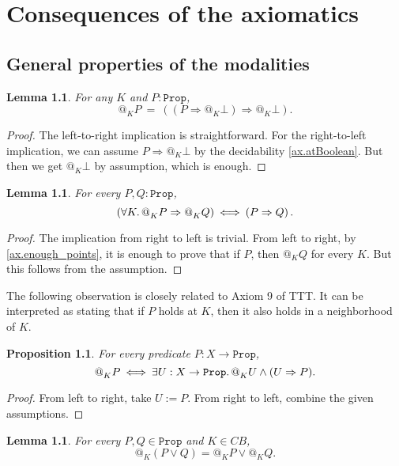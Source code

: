 \documentclass[11pt, oneside, article]{memoir}
\makeatletter
\theoremstyle{plain}
\newtheorem{proposition}[theorem]{Proposition}
\newtheorem{lemma}[theorem]{Lemma}
\theoremstyle{definition}
\theoremstyle{remark}
\newcommand{\const}[1]{\mathtt{#1}}
\newcommand{\Prop}{\const{Prop}}
\newcommand{\BaseSpace}{B}
\newcommand{\CB}{C\BaseSpace}
\newcommand{\AtSymbol}{{@}}
\newcommand{\At}[2][]{\AtSymbol^{#1}_{#2}}
\newcommand{\imp}{\Rightarrow}
\makeatother
\begin{document}
\chapter{Consequences of the axiomatics}

\section{General properties of the modalities}

\begin{lemma}
	\label{lem.at_double_neg}
	For any $K$ and $P : \Prop$,
	\[
		\At{K} P \: = \: \left( (P \imp \At{K} \bot) \imp \At{K} \bot \right) .
	\]
\end{lemma}

\begin{proof}
	The left-to-right implication is straightforward. For the right-to-left implication, we can assume $P \imp \At{K} \bot$ by the decidability \cref{ax.atBoolean}. But then we get $\At{K} \bot$ by assumption, which is enough.
\end{proof}

\begin{lemma}
For every $P,Q : \Prop$,
\[
	\left(\forall K\ldotp \At{K} P \imp \At{K} Q\right) \: \Longleftrightarrow \: \left(P \imp Q\right).
\]
\end{lemma}

\begin{proof}
	The implication from right to left is trivial. From left to right, by \cref{ax.enough_points}, it is enough to prove that if $P$, then $\At{K} Q$ for every $K$. But this follows from the assumption.
\end{proof}

The following observation is closely related to Axiom 9 of TTT. It can be interpreted as stating that if $P$ holds at $K$, then it also holds in a neighborhood of $K$.

\begin{proposition}
	\label{prop.at_to_nghbhd}
	For every predicate $P : X \to \Prop$,
	\[
		\At{K} P \: \Longleftrightarrow \: \exists U : X \to \Prop \ldotp \At{K} U \wedge (U \imp P).
	\]
\end{proposition}

\begin{proof}
	From left to right, take $U := P$. From right to left, combine the given assumptions.	
\end{proof}

\begin{lemma}
	\label{lem.at_vs_or}
	For every $P,Q \in \Prop$ and $K \in \CB$,
	\[
		\At{K}(P \lor Q) = \At{K}P \lor \At{K}Q.
	\]
\end{lemma}
\end{document}
